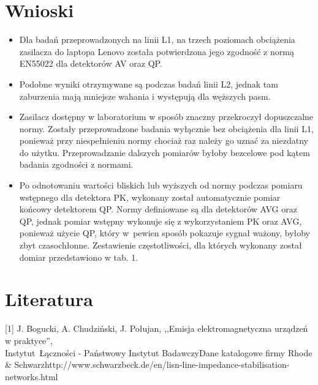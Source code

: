 \documentclass[12pt, a4paper, oneside]{article}
\begin{document}
\section{Wnioski}
\begin{itemize}
\item Dla badań przeprowadzonych na linii L1, na trzech poziomach obciążenia zasilacza do laptopa Lenovo została potwierdzona jego zgodność z normą EN55022 dla detektorów AV oraz QP.
\item Podobne wyniki otrzymywane są podczas badań linii L2, jednak tam zaburzenia mają mniejsze wahania i występują dla węższych pasm.
\item Zasilacz dostępny w laboratorium w sposób znaczny przekroczył dopuszczalne normy. Zostały przeprowadzone badania wyłącznie bez obciążenia dla linii L1, ponieważ przy niespełnieniu normy chociaż raz należy go uznać za niezdatny do użytku. Przeprowadzanie dalszych pomiarów byłoby bezcelowe pod kątem badania zgodności z normami.
\item Po odnotowaniu wartości bliskich lub wyższych od normy podczas pomiaru wstępnego dla detektora PK, wykonany został automatycznie pomiar końcowy detektorem QP. Normy definiowane są dla detektorów AVG oraz QP, jednak pomiar wstępny wykonuje się z wykorzystaniem PK oraz AVG, ponieważ użycie QP, który w~pewien sposób pokazuje sygnał ważony, byłoby zbyt czasochłonne. Zestawienie częstotliwości, dla których wykonany został domiar przedstawiono w tab. 1.
\end{itemize}
\clearpage
\section{Literatura}
[1] J. Bogucki, A. Chudziński, J. Połujan, ,,Emisja elektromagnetyczna urządzeń w praktyce'',\\ Instytut~Łączności - Państwowy Instytut Badawczy\newline\newline
[2] Dane katalogowe firmy Rhode \& Schwarz\newline\newline
[3] http://www.schwarzbeck.de/en/lisn-line-impedance-stabilisation-networks.html \newline\newline
\end{document}
